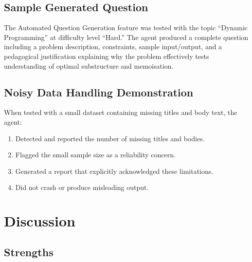 \documentclass[12pt, a4paper]{article}
\begin{document}
\subsection{Sample Generated Question}

The Automated Question Generation feature was tested with the topic ``Dynamic Programming'' at difficulty level ``Hard.'' The agent produced a complete question including a problem description, constraints, sample input/output, and a pedagogical justification explaining why the problem effectively tests understanding of optimal substructure and memoisation.

\subsection{Noisy Data Handling Demonstration}

When tested with a small dataset containing missing titles and body text, the agent:
\begin{enumerate}[noitemsep]
    \item Detected and reported the number of missing titles and bodies.
    \item Flagged the small sample size as a reliability concern.
    \item Generated a report that explicitly acknowledged these limitations.
    \item Did not crash or produce misleading output.
\end{enumerate}

\section{Discussion}
\label{sec:discussion}

\subsection{Strengths}
\end{document}
